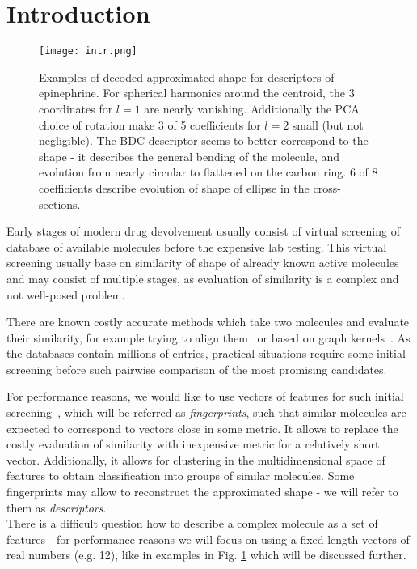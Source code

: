 \documentclass[10pt,journal]{IEEEtranTCOM}
\theoremstyle{plain}
\begin{document}
\section{Introduction}
\begin{figure}[t!]
    \centering
        \texttt{[image: intr.png]}
        \caption{Examples of decoded approximated shape for descriptors of epinephrine. For spherical harmonics around the centroid, the 3 coordinates for $l=1$ are nearly vanishing. Additionally the PCA choice of rotation make 3 of 5 coefficients for $l=2$ small (but not negligible). The BDC descriptor seems to better correspond to the shape - it describes the general bending of the molecule, and evolution from nearly circular to flattened on the carbon ring. 6 of 8 coefficients describe evolution of shape of ellipse in the cross-sections. }
        \label{intr}
\end{figure}
Early stages of modern drug devolvement usually consist of virtual screening of database of available molecules before the expensive lab testing. This virtual screening usually base on similarity of shape of already known active molecules and may consist of multiple stages, as evaluation of similarity is a complex and not well-posed problem.

There are known costly accurate methods which take two molecules and evaluate their similarity, for example trying to align them~\cite{align} or based on graph kernels~\cite{kernel}. As the databases contain millions of entries, practical situations require some initial screening before such pairwise comparison of the most promising candidates.

For performance reasons, we would like to use vectors of features for such initial screening~\cite{finger}, which will be referred as \emph{fingerprints}, such that similar molecules are expected to correspond to vectors close in some metric. It allows to replace the costly evaluation of similarity with inexpensive metric for a relatively short vector. Additionally, it allows for clustering in the multidimensional space of features to obtain classification into groups of similar molecules. Some fingerprints may allow to reconstruct the approximated shape - we will refer to them as \emph{descriptors}. \\

There is a difficult question how to describe a complex molecule as a set of features - for performance reasons we will focus on using a fixed length vectors of real numbers (e.g. 12), like in examples in Fig. \ref{intr} which will be discussed further.
\end{document}
